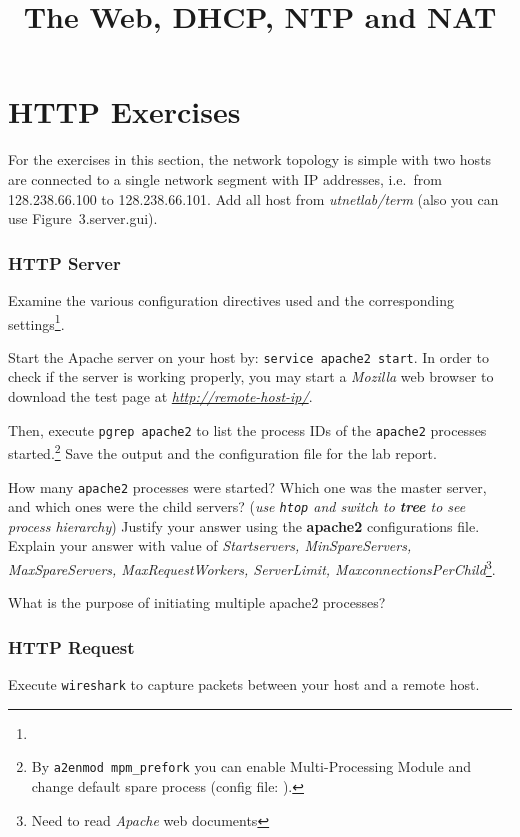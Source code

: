 \documentclass{../UTNetLab}
\title{The Web, DHCP, NTP and NAT}
\begin{document}
\part{HTTP Exercises}
    For the exercises in this section, the network topology is simple with two hosts are connected to a single network segment with IP addresses, i.e.\  from 128.238.66.100 to 128.238.66.101.
    Add all host from \textit{utnetlab/term} (also you can use {Figure~3.server.gui}).

\section{HTTP Server}
    Examine the various configuration directives used and the corresponding settings\footnote{}.

    Start the Apache server on your host by: \lstinline{service apache2 start}.
    In order to check if the server is working properly, you may start a \textit{Mozilla} web browser to download the test page at \href{http://remote-host-ip/}{\textit{http://remote-host-ip/}}.

    Then, execute \lstinline{pgrep apache2} to list the process IDs of the \lstinline{apache2} processes started.\footnote{By \lstinline{a2enmod mpm_prefork} you can enable Multi-Processing Module and change default spare process (config file: ).}
    Save the output and the configuration file for the lab report.
    
    \begin{report}
        \item How many \lstinline{apache2} processes were started?
            Which one was the master server, and which ones were the child servers? (\textit{use \lstinline{htop} and switch to \textbf{tree} to see process hierarchy})
            Justify your answer using the \textbf{apache2} configurations file.
            Explain your answer with value of \textit{Startservers, MinSpareServers, MaxSpareServers, MaxRequestWorkers, ServerLimit, MaxconnectionsPerChild}\footnote{Need to read \textit{Apache} web documents}.
        
        \item What is the purpose of initiating multiple apache2 processes?
    \end{report}

\section{HTTP Request}
    Execute \lstinline{wireshark} to capture packets between your host and a remote host.
\end{document}
